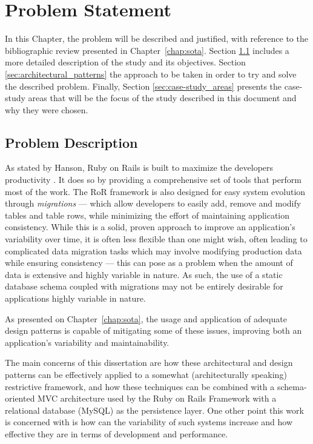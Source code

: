 \chapter{Problem Statement}\label{chap:problem_statement}

In this Chapter, the problem will be described and justified, with reference to the bibliographic review presented in Chapter~\ref{chap:sota}. Section \ref{sec:problem_description} includes a more detailed description of the study and its objectives. Section \ref{sec:architectural_patterns} the approach to be taken in order to try and solve the described problem. Finally, Section \ref{sec:case-study_areas} presents the case-study areas that will be the focus of the study described in this document and why they were chosen.

\section{Problem Description}\label{sec:problem_description}

As stated by Hanson, Ruby on Rails is built to maximize the developers productivity \cite{rubyonrails}. It does so by providing a comprehensive set of tools that perform most of the work. The RoR framework is also designed for easy system evolution through \emph{migrations} --- which allow developers to easily add, remove and modify tables and table rows, while minimizing the effort of maintaining application consistency. While this is a solid, proven approach to improve an application's variability over time, it is often less flexible than one might wish, often leading to complicated data migration tasks which may involve modifying production data while ensuring consistency --- this can pose as a problem when the amount of data is extensive and highly variable in nature. As such, the use of a static database schema coupled with migrations may not be entirely desirable for applications highly variable in nature.

As presented on Chapter~\ref{chap:sota}, the usage and application of adequate design patterns is capable of mitigating some of these issues, improving both an application's variability and maintainability.

The main concerns of this dissertation are how these architectural and design patterns can be effectively applied to a somewhat (architecturally speaking) restrictive framework, and how these techniques can be combined with a schema-oriented MVC architecture used by the Ruby on Rails Framework with a relational database (MySQL) as the persistence layer. One other point this work is concerned with is how can the variability of such systems increase and how effective they are in terms of development and performance.

